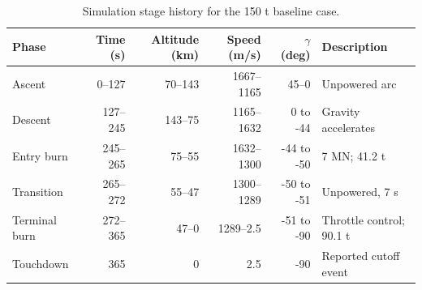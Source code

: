 \begin{table}[htbp]
\caption{Simulation stage history for the 150 t baseline case.}
\label{tab:src6}
\small
\setlength{\tabcolsep}{3.5pt}
\begin{tabularx}{\linewidth}{@{}p{.16\linewidth}rrrrX@{}}
\toprule
Phase & Time (s) & Altitude (km) & Speed (m/s) & $\gamma$ (deg) & Description \\
\midrule
Ascent & 0--127 & 70--143 & 1667--1165 & 45--0 & Unpowered arc \\
Descent & 127--245 & 143--75 & 1165--1632 & 0 to -44 & Gravity accelerates \\
Entry burn & 245--265 & 75--55 & 1632--1300 & -44 to -50 & 7 MN; 41.2 t \\
Transition & 265--272 & 55--47 & 1300--1289 & -50 to -51 & Unpowered, 7 s \\
Terminal burn & 272--365 & 47--0 & 1289--2.5 & -51 to -90 & Throttle control; 90.1 t \\
Touchdown & 365 & 0 & 2.5 & -90 & Reported cutoff event \\
\bottomrule
\end{tabularx}
\end{table}
